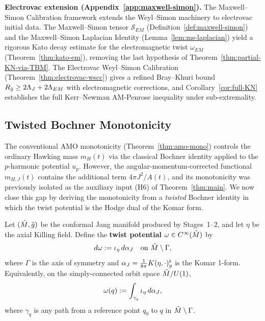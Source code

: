 \smallskip
\textbf{Electrovac extension (Appendix~\ref{app:maxwell-simon}).} The Maxwell--Simon Calibration framework extends the Weyl--Simon machinery to electrovac initial data. The Maxwell--Simon tensor $\mathcal{S}_{EM}$ (Definition~\ref{def:maxwell-simon}) and the Maxwell--Simon Laplacian Identity (Lemma~\ref{lem:ms-laplacian}) yield a rigorous Kato decay estimate for the electromagnetic twist $\omega_{EM}$ (Theorem~\ref{thm:kato-em}), removing the last hypothesis of Theorem~\ref{thm:partial-KN-via-TBM}. The Electrovac Weyl--Simon Calibration (Theorem~\ref{thm:electrovac-wscc}) gives a refined Bray--Khuri bound $R_{\bar{g}}\geq 2\Lambda_J + 2\Lambda_{EM}$ with electromagnetic corrections, and Corollary~\ref{cor:full-KN} establishes the full Kerr--Newman AM-Penrose inequality under sub-extremality.
\subsection{Twisted Bochner Monotonicity}

The conventional AMO monotonicity (Theorem~\ref{thm:amo-mono}) controls the ordinary Hawking mass $m_H(t)$ via the classical Bochner identity applied to the $p$-harmonic potential $u_p$. However, the angular-momentum-corrected functional $m_{H,J}(t)$ contains the additional term $4\pi J^2/A(t)$, and its monotonicity was previously isolated as the auxiliary input (H6) of Theorem~\ref{thm:main}. We now close this gap by deriving the monotonicity from a \emph{twisted} Bochner identity in which the twist potential is the Hodge dual of the Komar form.

\begin{definition}\label{def:twist-potential}
Let $(\tilde{M}, \tilde{g})$ be the conformal Jang manifold produced by Stages~1--2, and let $\eta$ be the axial Killing field. Define the \textbf{twist potential} $\omega \in C^\infty(\tilde{M})$ by
\begin{equation}\label{eq:twist-def}
d\omega := \iota_\eta \, d\alpha_J \quad \text{on } \tilde{M} \setminus \Gamma,
\end{equation}
where $\Gamma$ is the axis of symmetry and $\alpha_J = \tfrac{1}{8\pi} K(\eta, \cdot)^\flat_g$ is the Komar 1-form. Equivalently, on the simply-connected orbit space $\tilde{M}/U(1)$,
\begin{equation}
\omega(q) := \int_{\gamma_q} \iota_\eta \, d\alpha_J,
\end{equation}
where $\gamma_q$ is any path from a reference point $q_0$ to $q$ in $\tilde{M} \setminus \Gamma$.
\end{definition}

